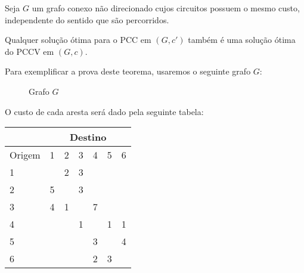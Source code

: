         \begin{theorem}
            \label{windy-theorem}
            Seja $G$ um grafo conexo não direcionado cujos circuitos possuem o mesmo custo, independente do sentido que são percorridos. 

            Qualquer solução ótima para o PCC em $(G, c')$ também é uma solução ótima do PCCV em $(G, c)$.

        \end{theorem}

        Para exemplificar a prova deste teorema, usaremos o seguinte grafo $G$:
    
        \begin{figure}[H]
            \centering
            \caption{Grafo $G$}
            \label{goriginal}
        \end{figure}

        O custo de cada aresta será dado pela seguinte tabela:

        \begin{center}
            \begin{tabular}{|p{1.5cm}||p{1cm}|p{1cm}|p{1cm}|p{1cm}|p{1cm}|p{1cm}|}
                \hline
                    & \multicolumn{6}{|c|}{Destino} \\
                \hline
                   Origem & 1 & 2 & 3 & 4 & 5 & 6\\
                \hline
                \hline
                1 &  & 2 & 3 &  & & \\
                \hline
                2 & 5 &  & 3 & & & \\
                \hline
                3 & 4 & 1 & & 7 & & \\
                \hline
                4 &  & & 1 & & 1 & 1\\
                \hline
                5 &  & & & 3 & & 4\\
                \hline
                6 &  &  & & 2 & 3 &\\
                \hline
            \end{tabular}
        \end{center}
        

